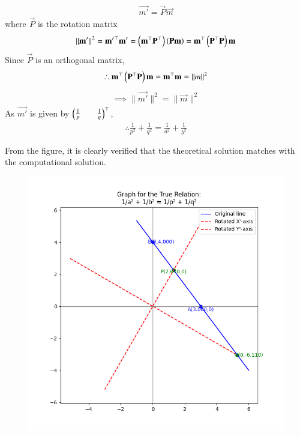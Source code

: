\documentclass[journal]{IEEEtran}
\begin{document}
\begin{align}
     \vec{m'}=\vec{P}\vec{m}       
\end{align}
where $\vec{P}$ is the rotation matrix
\begin{align}
    \|\mathbf{m'}\|^2=\mathbf{m'}^{\top}\mathbf{m'}=\left(\mathbf{m}^{\top}\mathbf{P}^{\top}\right)\left(\mathbf{P}\mathbf{m}\right)=\mathbf{m}^{\top}\left(\mathbf{P}^{\top}\mathbf{P}\right)\mathbf{m}
\end{align}
Since $\vec{P}$ is an orthogonal matrix,
\begin{align}
    \therefore \mathbf{m}^{\top}\left(\mathbf{P}^{\top}\mathbf{P}\right)\mathbf{m}=\mathbf{m}^{\top}\mathbf{m}=\|m\|^2
\end{align}
\begin{align}
    \implies \|\vec{m'}\|^2=\|\vec{m}\|^2
\end{align}
As $\vec{m'}$ is given by $\begin{pmatrix}\frac{1}{p}&&\frac{1}{q}\end{pmatrix}^{\top}$,
\begin{align}
    \therefore \frac{1}{p^2}+\frac{1}{q^2}=\frac{1}{a^2}+\frac{1}{b^2}
\end{align}

\newpage
\vspace*{0.25cm}

From the figure, it is clearly verified that the theoretical solution matches with the computational solution.\\
\begin{figure}[H]
    \centering
    \includegraphics[width=0.8\columnwidth]{figs/Figure_1.png}
    \label{fig:1}
\end{figure}
\end{document}
